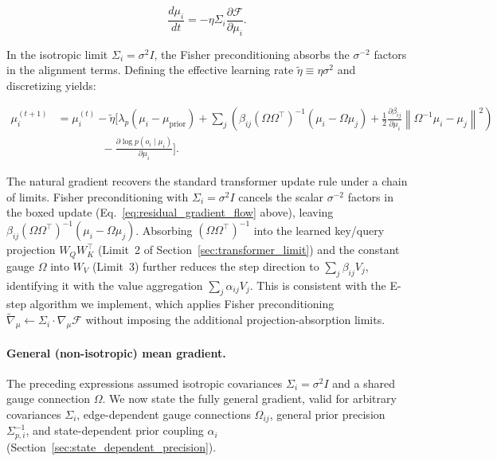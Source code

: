 \documentclass[twoside,11pt]{article}
\begin{document}
\begin{equation}
\frac{d\mu_i}{dt} = -\eta \Sigma_i \frac{\partial \mathcal{F}}{\partial \mu_i}.
\end{equation}

In the isotropic limit $\Sigma_i = \sigma^2 I$, the Fisher preconditioning absorbs the $\sigma^{-2}$ factors in the alignment terms. Defining the effective learning rate $\tilde{\eta} \equiv \eta\sigma^2$ and discretizing yields:

\begin{equation}
\boxed{
\begin{aligned}
\mu_i^{(t+1)}
&= \mu_i^{(t)}
- \tilde{\eta} \Bigg[
  \lambda_p \left(\mu_i - \mu_{\text{prior}}\right)
  + \sum_j \left(
  \beta_{ij} (\Omega\Omega^\top)^{-1}\left(\mu_i - \Omega\mu_j\right)
  + \frac{1}{2}
  \frac{\partial \beta_{ij}}{\partial \mu_i}
  \left\|\Omega^{-1}\mu_i - \mu_j\right\|^2
  \right) \\
&\qquad\qquad
  - \frac{\partial \log p(o_i \mid \mu_i)}{\partial \mu_i}
\Bigg].
\end{aligned}
}
\end{equation}

The natural gradient recovers the standard transformer update rule under a chain of limits. Fisher preconditioning with $\Sigma_i = \sigma^2 I$ cancels the scalar $\sigma^{-2}$ factors in the boxed update (Eq.~\ref{eq:residual_gradient_flow} above), leaving $\beta_{ij}(\Omega\Omega^\top)^{-1}(\mu_i - \Omega\mu_j)$. Absorbing $(\Omega\Omega^\top)^{-1}$ into the learned key/query projection $W_Q W_K^\top$ (Limit~2 of Section~\ref{sec:transformer_limit}) and the constant gauge $\Omega$ into $W_V$ (Limit~3) further reduces the step direction to $\sum_j \beta_{ij} V_j$, identifying it with the value aggregation $\sum_j \alpha_{ij} V_j$. This is consistent with the E-step algorithm we implement, which applies Fisher preconditioning $\tilde{\nabla}_\mu \leftarrow \Sigma_i \cdot \nabla_\mu \mathcal{F}$ without imposing the additional projection-absorption limits.

\paragraph{General (non-isotropic) mean gradient.}
The preceding expressions assumed isotropic covariances $\Sigma_i = \sigma^2 I$ and a shared gauge connection $\Omega$. We now state the fully general gradient, valid for arbitrary covariances $\Sigma_i$, edge-dependent gauge connections $\Omega_{ij}$, general prior precision $\Sigma_{p,i}^{-1}$, and state-dependent prior coupling $\alpha_i$ (Section~\ref{sec:state_dependent_precision}).
\end{document}
